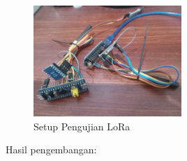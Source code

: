\documentclass{book} %
\begin{document}
	\begin{figure}[!ht]
		\centering
		\includegraphics[width=0.5\textwidth,angle=180]{images/lorates.jpg}
		\caption{Setup Pengujian LoRa}
	\end{figure}
	
	\newpage
	
	Hasil pengembangan:
	
\end{document}
